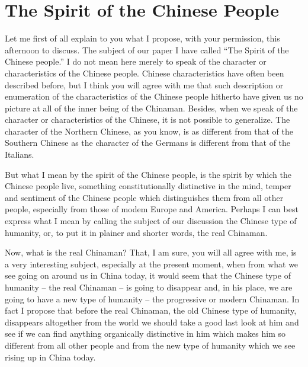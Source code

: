 
\chapter[The Spirit of the Chinese People]
{The Spirit of the Chinese People}


Let me first of all explain to you what I propose, with your permission, this afternoon to discuss.
The subject of our paper I have called ``The Spirit of the Chinese people.''
I do not mean here merely to speak of the character or characteristics of the Chinese people.
Chinese characteristics have often been described before,
but I think you will agree with me that such description or enumeration of the characteristics of the Chinese people hitherto
have given us no picture at all of the inner being of the Chinaman.
Besides, when we speak of the character or characteristics of the Chinese,
it is not possible to generalize.
The character of the Northern Chinese, as you know,
is as different from that of the Southern Chinese as the character of the Germans is different from that of the Italians.

But what I mean by the spirit of the Chinese people, is the spirit by which the Chinese people live, something constitutionally distinctive in the mind,
temper and sentiment of the Chinese people which distinguishes them from all other people, especially from those of modem Europe and America.
Perhaps I can best express what I mean by calling the subject of our discussion the Chinese type of humanity, or, to put it in plainer and shorter words, the real Chinaman.

Now, what is the real Chinaman? That, I am sure, you will all agree with me,
is a very interesting subject, especially at the present moment,
when from what we see going on around us in China today,
it would seem that the Chinese type of humanity -- the real Chinaman -- is going to disappear and,
in his place, we are going to have a new type of humanity -- the progressive or modern Chinaman.
In fact I propose that before the real Chinaman,
the old Chinese type of humanity, disappears altogether from the world
we should take a good last look at him
and see if we can find anything organically distinctive in him
which makes him so different from all other people
and from the new type of humanity which we see rising up in China today.


